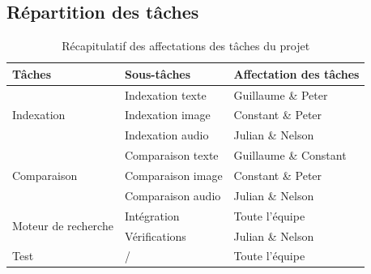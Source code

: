 \documentclass[../main.tex]{subfiles}
\begin{document}
    \subsection{Répartition des tâches}

    \begin{table}[H]
        \centering
        \begin{tabular}{ | m{10em} | m{10em} | m{10em} | }
            \hline
            \rowcolor{Gray} Tâches & Sous-tâches & Affectation des tâches \\
            \hline
            \multirow{3}{10em}{Indexation} 
            & Indexation texte & Guillaume \& Peter \\
            \cline{2-3}
            & Indexation image & Constant \& Peter \\
            \cline{2-3}
            & Indexation audio & Julian \& Nelson \\
            \hline

            \multirow{3}{10em}{Comparaison} 
            & Comparaison texte & Guillaume \& Constant \\
            \cline{2-3}
            & Comparaison image & Constant \& Peter \\
            \cline{2-3}
            & Comparaison audio & Julian \& Nelson \\
            \hline

            \multirow{2}{10em}{Moteur de recherche} 
            & Intégration & Toute l'équipe \\
            \cline{2-3}
            & Vérifications & Julian \& Nelson \\
            \hline

            \multirow{1}{10em}{Test} & / & Toute l'équipe \\
            \hline


            \hline
        \end{tabular}
        \caption{Récapitulatif des affectations des tâches du projet}
    \end{table}
\end{document}
